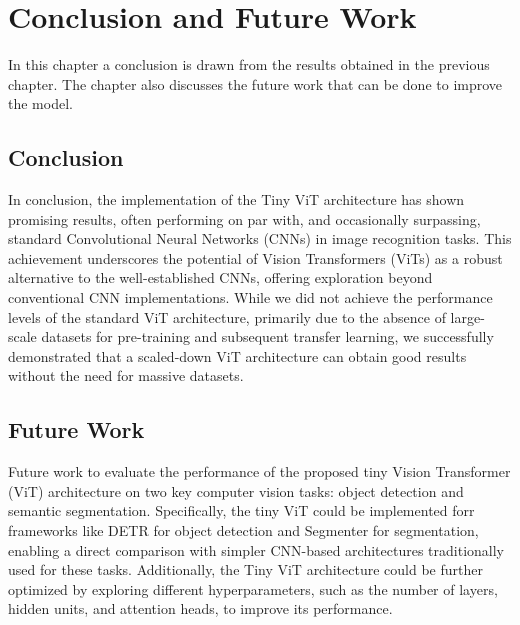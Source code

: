 \section{Conclusion and Future Work}
In this chapter a conclusion is drawn from the results obtained in the previous chapter. The chapter also discusses the future work that can be done to improve the model.

\subsection{Conclusion}
In conclusion, the implementation of the Tiny ViT architecture has shown promising results, often performing on par with, and occasionally surpassing, standard Convolutional Neural Networks (CNNs) in image recognition tasks. This achievement underscores the potential of Vision Transformers (ViTs) as a robust alternative to the well-established CNNs, offering exploration beyond conventional CNN implementations. While we did not achieve the performance levels of the standard ViT architecture, primarily due to the absence of large-scale datasets for pre-training and subsequent transfer learning, we successfully demonstrated that a scaled-down ViT architecture can obtain good results without the need for massive datasets.
\subsection{Future Work}
Future work to evaluate the performance of the proposed tiny Vision Transformer (ViT) architecture on two key computer vision tasks: object detection and semantic segmentation. Specifically, the tiny ViT could be implemented forr frameworks like DETR \cite{carion2020end} for object detection and Segmenter \cite{strudel2021segmenter} for segmentation, enabling a direct comparison with simpler CNN-based architectures traditionally used for these tasks. Additionally, the Tiny ViT architecture could be further optimized by exploring different hyperparameters, such as the number of layers, hidden units, and attention heads, to improve its performance.